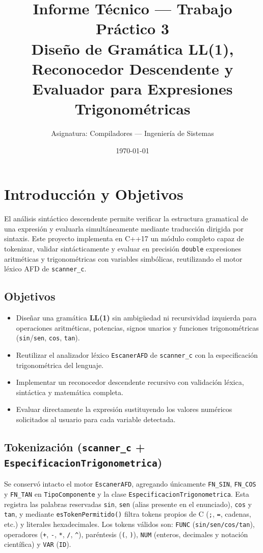 \documentclass[10pt,a4paper]{article}
\title{\textbf{Informe Técnico — Trabajo Práctico 3}\\
Diseño de Gramática LL(1), Reconocedor Descendente y Evaluador para Expresiones Trigonométricas}
\author{Asignatura: Compiladores — Ingeniería de Sistemas}
\date{\today}
\begin{document}
\maketitle

\section{Introducción y Objetivos}
El análisis sintáctico descendente permite verificar la estructura gramatical de una expresión y evaluarla simultáneamente mediante traducción dirigida por sintaxis. Este proyecto implementa en C++17 un módulo completo capaz de tokenizar, validar sintácticamente y evaluar en precisión \texttt{double} expresiones aritméticas y trigonométricas con variables simbólicas, reutilizando el motor léxico AFD de \texttt{scanner\_c}.

\subsection*{Objetivos}
\begin{itemize}
    \item Diseñar una gramática \textbf{LL(1)} sin ambigüedad ni recursividad izquierda para operaciones aritméticas, potencias, signos unarios y funciones trigonométricas (\texttt{sin}/\texttt{sen}, \texttt{cos}, \texttt{tan}).
    \item Reutilizar el analizador léxico \texttt{EscanerAFD} de \texttt{scanner\_c} con la especificación trigonométrica del lenguaje.
    \item Implementar un reconocedor descendente recursivo con validación léxica, sintáctica y matemática completa.
    \item Evaluar directamente la expresión sustituyendo los valores numéricos solicitados al usuario para cada variable detectada.
\end{itemize}

\subsection*{Tokenización (\texttt{scanner\_c} + \texttt{EspecificacionTrigonometrica})}
Se conservó intacto el motor \texttt{EscanerAFD}, agregando únicamente \texttt{FN\_SIN}, \texttt{FN\_COS} y \texttt{FN\_TAN} en \texttt{TipoComponente} y la clase \texttt{EspecificacionTrigonometrica}. Esta registra las palabras reservadas \texttt{sin}, \texttt{sen} (alias presente en el enunciado), \texttt{cos} y \texttt{tan}, y mediante \texttt{esTokenPermitido()} filtra tokens propios de C (\texttt{;}, \texttt{=}, cadenas, etc.) y literales hexadecimales. Los tokens válidos son: \texttt{FUNC} (\texttt{sin/sen/cos/tan}), operadores (\texttt{+}, \texttt{-}, \texttt{*}, \texttt{/}, \texttt{\^{}}), paréntesis (\texttt{(}, \texttt{)}), \texttt{NUM} (enteros, decimales y notación científica) y \texttt{VAR} (\texttt{ID}).
\end{document}
